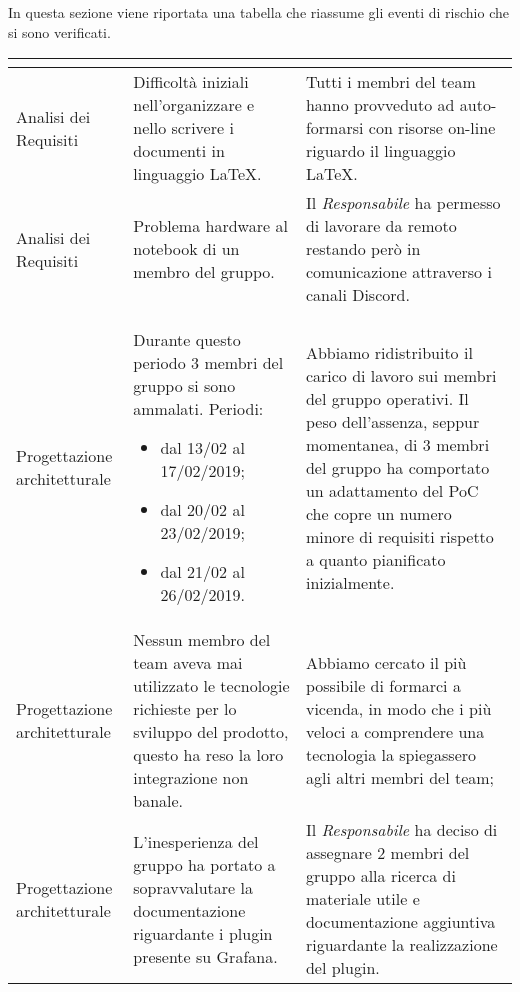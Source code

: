 In questa sezione viene riportata una tabella che riassume gli eventi di rischio che si sono verificati.
\vspace{1cm}
\renewcommand{\arraystretch}{1.5}
\begin{longtable}{| m{7em} | m{15em} | m{16em} |}
\hline
\rowcolor{title_row}
\textbf{\color{title_text}{Periodo}}  & \textbf{\color{title_text}{Evento}} & \textbf{\color{title_text}{Reazione}} \\
\endhead
\hline
Analisi dei Requisiti & Difficoltà iniziali nell'organizzare e nello scrivere i documenti in linguaggio \LaTeX. & Tutti i membri del team hanno provveduto ad auto-formarsi con risorse on-line riguardo il linguaggio \LaTeX. \\
\hline

Analisi dei Requisiti & Problema hardware al notebook di un membro del gruppo. &  Il \emph{Responsabile} ha permesso di lavorare da remoto restando però in comunicazione attraverso i canali Discord.\\
\hline

Progettazione architetturale & Durante questo periodo 3 membri del gruppo si sono ammalati. Periodi:\begin{itemize}
    \item dal 13/02 al 17/02/2019;
    \item dal 20/02 al 23/02/2019;
    \item dal 21/02 al 26/02/2019.
\end{itemize} & Abbiamo ridistribuito il carico di lavoro sui membri del gruppo operativi.
Il peso dell'assenza, seppur momentanea, di 3 membri del gruppo ha comportato un adattamento del PoC che copre un numero minore di requisiti rispetto a quanto pianificato inizialmente. \\
\hline

Progettazione architetturale & Nessun membro del team aveva mai utilizzato le tecnologie richieste per lo sviluppo del prodotto, questo ha reso la loro integrazione non banale. & Abbiamo cercato il più possibile di formarci a vicenda, in modo che i più veloci a comprendere una tecnologia la spiegassero agli altri membri del team; \\
\hline

Progettazione architetturale & L'inesperienza del gruppo ha portato a sopravvalutare la documentazione riguardante i plugin presente su Grafana. & Il \emph{Responsabile} ha deciso di assegnare 2 membri del gruppo alla ricerca di materiale utile e documentazione aggiuntiva riguardante la realizzazione del plugin. \\
\hline


\end{longtable}
